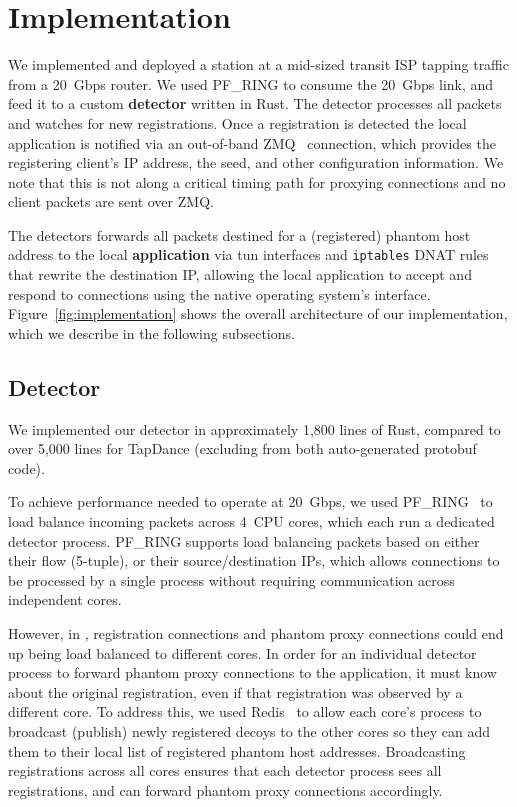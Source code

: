 \documentclass[sigconf]{acmart}
\begin{document}
\TabApplications


\section{Implementation}
\label{sec:implementation}

We implemented \scheme and deployed a station at a mid-sized transit ISP tapping 
traffic from a 20~Gbps router. We used PF\_RING to
consume the 20~Gbps link, and feed it to a custom \textbf{detector} written in Rust. The
detector processes all packets and watches for new registrations. Once a registration 
is detected the local application is notified via an 
out-of-band ZMQ~\cite{zmq} connection, which provides the
registering client's IP address, the seed, and other configuration
information. We note that this is not along a critical timing path for 
proxying connections and no client packets are sent over ZMQ\@.

The detectors forwards all packets destined for a (registered) phantom host address to the local
\textbf{application} via tun interfaces and \texttt{iptables} DNAT rules that rewrite the destination IP,
allowing the local application to accept and respond to connections using the native
operating system's interface. Figure~\ref{fig:implementation} shows the overall
architecture of our implementation, which we describe in the following subsections.

\FigImplementation

\subsection{Detector}

We implemented our detector in approximately 1,800 lines of Rust, compared to
over 5,000 lines for TapDance (excluding from both auto-generated protobuf code).

To achieve performance needed to operate at 20~Gbps, we used
PF\_RING~\cite{pfring} to load balance incoming packets across 4~CPU cores,
which each run a dedicated detector process.
PF\_RING supports load balancing packets based on
either their flow (5-tuple), or their source/destination IPs, which allows
connections to be processed by a single process without
requiring communication across independent cores.

However, in \scheme, registration connections and phantom proxy connections
could end up being load balanced to different cores. In order for an individual
detector process to forward phantom proxy connections to the application, it must
know about the original registration, even if that registration was observed by a
different core.
To address this, we used Redis~\cite{redis} to allow each core's process to broadcast
(publish) newly registered decoys to the other cores so they can
add them to their local list of registered phantom host addresses. Broadcasting
registrations across all cores ensures that each detector process sees all
registrations, and can forward phantom proxy connections accordingly.
\end{document}
